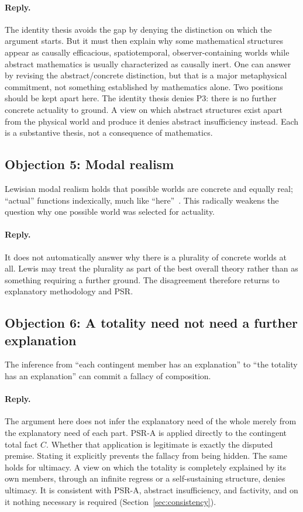 \documentclass[11pt,letterpaper]{article}
\theoremstyle{plain}
\theoremstyle{definition}
\begin{document}
\paragraph{Reply.} The identity thesis avoids the gap by denying the distinction on which the argument starts. But it must then explain why some mathematical structures appear as causally efficacious, spatiotemporal, observer-containing worlds while abstract mathematics is usually characterized as causally inert. One can answer by revising the abstract/concrete distinction, but that is a major metaphysical commitment, not something established by mathematics alone. Two positions should be kept apart here. The identity thesis denies P3: there is no further concrete actuality to ground. A view on which abstract structures exist apart from the physical world and produce it denies abstract insufficiency instead. Each is a substantive thesis, not a consequence of mathematics.

\subsection{Objection 5: Modal realism}

Lewisian modal realism holds that possible worlds are concrete and equally real; ``actual'' functions indexically, much like ``here''~\cite{lewis}. This radically weakens the question why one possible world was selected for actuality.

\paragraph{Reply.} It does not automatically answer why there is a plurality of concrete worlds at all. Lewis may treat the plurality as part of the best overall theory rather than as something requiring a further ground. The disagreement therefore returns to explanatory methodology and PSR.

\subsection{Objection 6: A totality need not need a further explanation}

The inference from ``each contingent member has an explanation'' to ``the totality has an explanation'' can commit a fallacy of composition.

\paragraph{Reply.} The argument here does not infer the explanatory need of the whole merely from the explanatory need of each part. PSR-A is applied directly to the contingent total fact $C$. Whether that application is legitimate is exactly the disputed premise. Stating it explicitly prevents the fallacy from being hidden. The same holds for ultimacy. A view on which the totality is completely explained by its own members, through an infinite regress or a self-sustaining structure, denies ultimacy. It is consistent with PSR-A, abstract insufficiency, and factivity, and on it nothing necessary is required (Section~\ref{sec:consistency}).
\end{document}
